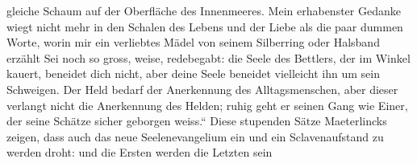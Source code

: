gleiche Schaum auf der Oberfläche des Innenmeeres. Mein erhabenster Gedanke wiegt nicht mehr in den Schalen des Lebens und der Liebe als die paar dummen Worte, worin mir ein verliebtes Mädel von seinem Silberring oder Halsband erzählt  Sei noch so gross, weise, redebegabt: die Seele des Bettlers, der im Winkel kauert, beneidet dich nicht, aber deine Seele beneidet vielleicht ihn um sein Schweigen. Der Held bedarf der Anerkennung des Alltagsmenschen, aber dieser verlangt nicht die Anerkennung des Helden; ruhig geht er seinen Gang wie Einer, der seine Schätze sicher geborgen weiss.“ Diese stupenden Sätze Maeterlincks zeigen, dass auch das neue Seelenevangelium ein  und ein Sclavenaufstand zu werden droht: und die Ersten werden die Letzten sein 
\par


